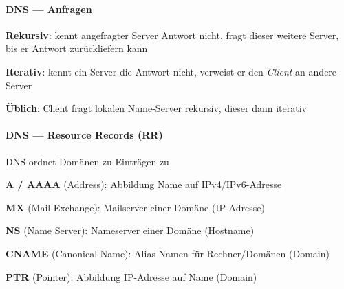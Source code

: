 \paragraph{DNS --- Anfragen}
\begin{items}
  \item \textbf{Rekursiv}: kennt angefragter Server Antwort nicht, fragt dieser weitere Server, bis er Antwort zurückliefern kann
  \item \textbf{Iterativ}: kennt ein Server die Antwort nicht, verweist er den \emph{Client} an andere Server
  \item \textbf{Üblich}: Client fragt lokalen Name-Server rekursiv, dieser dann iterativ
\end{items}

\paragraph{DNS --- Resource Records (RR)}
\begin{items}
  \item DNS ordnet Domänen zu Einträgen zu
  \item \textbf{A / AAAA} (Address): Abbildung Name auf IPv4/IPv6-Adresse
  \item \textbf{MX} (Mail Exchange): Mailserver einer Domäne (IP-Adresse)
  \item \textbf{NS} (Name Server): Nameserver einer Domäne (Hostname)
  \item \textbf{CNAME} (Canonical Name): Alias-Namen für Rechner/Domänen (Domain)
  \item \textbf{PTR} (Pointer): Abbildung IP-Adresse auf Name (Domain)
\end{items}

